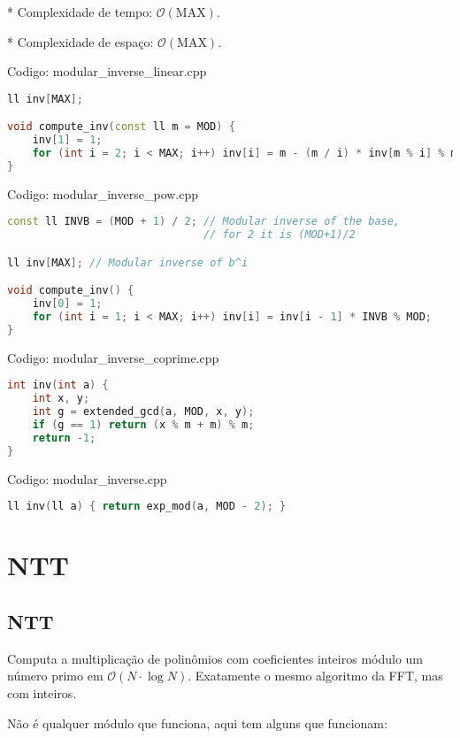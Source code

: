 \documentclass[10pt, a4paper, oneside]{book}
\begin{document}
* Complexidade de tempo: $\mathcal{O}(\text{MAX})$.

* Complexidade de espaço: $\mathcal{O}(\text{MAX})$.
\hfill

Codigo: modular\_inverse\_linear.cpp

\begin{lstlisting}[language=C++]
ll inv[MAX];

void compute_inv(const ll m = MOD) {
    inv[1] = 1;
    for (int i = 2; i < MAX; i++) inv[i] = m - (m / i) * inv[m % i] % m;
}
\end{lstlisting}
\hfill

Codigo: modular\_inverse\_pow.cpp

\begin{lstlisting}[language=C++]
const ll INVB = (MOD + 1) / 2; // Modular inverse of the base,
                               // for 2 it is (MOD+1)/2

ll inv[MAX]; // Modular inverse of b^i

void compute_inv() {
    inv[0] = 1;
    for (int i = 1; i < MAX; i++) inv[i] = inv[i - 1] * INVB % MOD;
}
\end{lstlisting}
\hfill

Codigo: modular\_inverse\_coprime.cpp

\begin{lstlisting}[language=C++]
int inv(int a) {
    int x, y;
    int g = extended_gcd(a, MOD, x, y);
    if (g == 1) return (x % m + m) % m;
    return -1;
}
\end{lstlisting}
\hfill

Codigo: modular\_inverse.cpp

\begin{lstlisting}[language=C++]
ll inv(ll a) { return exp_mod(a, MOD - 2); }
\end{lstlisting}
\hfill

\section{NTT}
\subsection{NTT}


Computa a multiplicação de polinômios com coeficientes inteiros módulo um número primo em $\mathcal{O}(N \cdot \log N)$. Exatamente o mesmo algoritmo da FFT, mas com inteiros.



Não é qualquer módulo que funciona, aqui tem alguns que funcionam:
\end{document}
